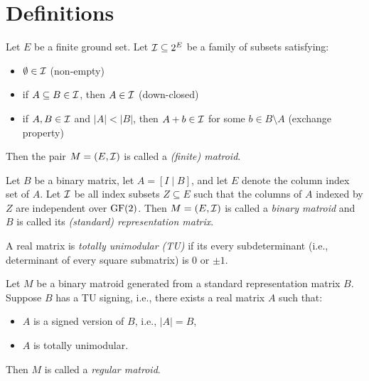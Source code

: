 \section{Definitions}

\begin{definition}
  \label{def:code_finite_matroid}
  Let $E$ be a finite ground set. Let $\mathcal{I} \subseteq 2^{E}$ be a family of subsets satisfying:
  \begin{itemize}
    \item $\emptyset \in \mathcal{I}$ (non-empty)
    \item if $A \subseteq B \in \mathcal{I}$, then $A \in \mathcal{I}$ (down-closed)
    \item if $A ,B \in \mathcal{I}$ and $\left| A \right| < \left| B \right|$,
          then $A + b \in \mathcal{I}$ for some $b \in B \setminus A$ (exchange property)
  \end{itemize}
  Then the pair $M = \left(E, \mathcal{I}\right)$ is called a \emph{(finite) matroid}.
\end{definition}

\begin{definition}
  \label{def:code_binary_matroid}
  Let $B$ be a binary matrix, let $A = \left[ I \mid B \right]$, and let $E$ denote the column index set of $A$.
  Let $\mathcal{I}$ be all index subsets $Z \subseteq E$ such that the columns of $A$ indexed by $Z$ are independent over $\mathrm{GF}(2)$.
  Then $M = \left(E, \mathcal{I}\right)$ is called a \emph{binary matroid} and $B$ is called its \emph{(standard) representation matrix}.
\end{definition}

\begin{definition}[TU matrix]
  \label{def:code_tu_matrix}
  A real matrix is \emph{totally unimodular (TU)} if its every subdeterminant (i.e., determinant of every square submatrix) is $0$ or $\pm 1$.
\end{definition}

\begin{definition}
  \label{def:code_regular_matroid}
  Let $M$ be a binary matroid generated from a standard representation matrix $B$. Suppose $B$ has a TU signing, i.e., there exists a real matrix $A$ such that:
  \begin{itemize}
    \item $A$ is a signed version of $B$, i.e., $\left| A \right| = B$,
    \item $A$ is totally unimodular.
  \end{itemize}
  Then $M$ is called a \emph{regular matroid}.
\end{definition}
